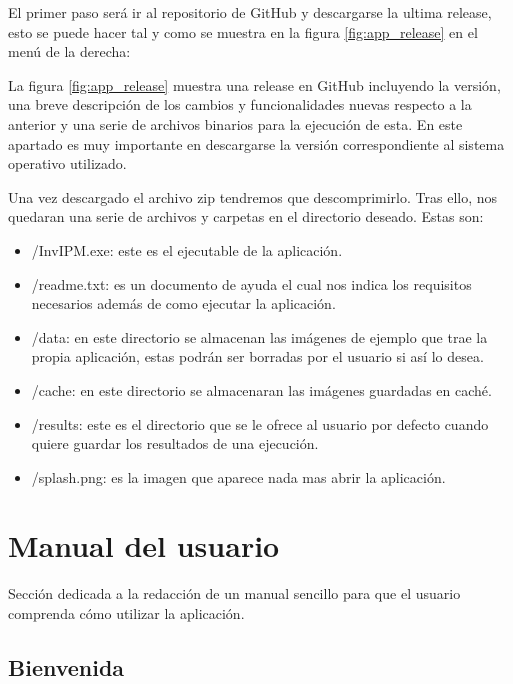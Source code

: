 El primer paso será ir al repositorio de GitHub y descargarse la ultima release, esto se puede hacer tal y como se muestra en la figura \ref{fig:app_release} en el menú de la derecha:


La figura \ref{fig:app_release} muestra una release en GitHub incluyendo la versión, una breve descripción de los cambios y funcionalidades nuevas respecto a la anterior y una serie de archivos binarios para la ejecución de esta. En este apartado es muy importante en descargarse la versión correspondiente al sistema operativo utilizado.

Una vez descargado el archivo zip tendremos que descomprimirlo. Tras ello, nos quedaran una serie de archivos y carpetas en el directorio deseado. Estas son:
    \begin{itemize}
        \item /InvIPM.exe: este es el ejecutable de la aplicación.
        \item /readme.txt: es un documento de ayuda el cual nos indica los requisitos necesarios además de como ejecutar la aplicación.
        \item /data: en este directorio se almacenan las imágenes de ejemplo que trae la propia aplicación, estas podrán ser borradas por el usuario si así lo desea.
        \item /cache: en este directorio se almacenaran las imágenes guardadas en caché.
        \item /results: este es el directorio que se le ofrece al usuario por defecto cuando quiere guardar los resultados de una ejecución.
        \item /splash.png: es la imagen que aparece nada mas abrir la aplicación.
    \end{itemize}
    
\section{Manual del usuario}\label{manual-del-usuario}

Sección dedicada a la redacción de un manual sencillo para que el usuario comprenda cómo utilizar la aplicación.

\subsection{Bienvenida}\label{bienvenida}

